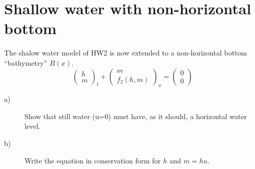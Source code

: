 \section{Shallow water with non-horizontal bottom} 

\label{sec:shallow_water_with_non_horizontal_bottom}

The shalow water model of HW2 is now extended to a non-horizontal bottom ``bathymetry'' ${B(x)}$.
\begin{equation}
	\begin{pmatrix}
		h\\m 
	\end{pmatrix}
	_t + 
	\begin{pmatrix}
		m\\f_2(h,m) 
	\end{pmatrix}
	_x =
	\begin{pmatrix}
		0\\0 
	\end{pmatrix}
	\label{eq:1} 
\end{equation}

\begin{description}
	\item[a)] Show that still water (u=0) must have, as it should, a horizontal water level.
	\item[b)] Write the equation in conservation form for $h$ and $m=hu$.
\end{description}


